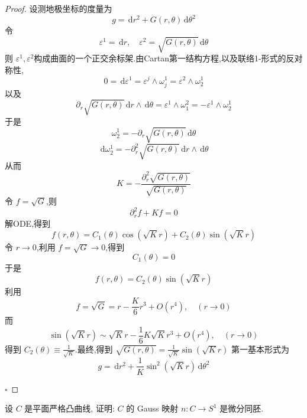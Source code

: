 \documentclass[../../main.tex]{subfiles}
\begin{document}
\begin{proof}
    设测地极坐标的度量为 \[
    g = \,\mathrm{d} r^{2}+ G\left( r, \theta  \right)\,\mathrm{d}  \theta ^{2} 
    \]令 \[
     \varepsilon ^{1}= \,\mathrm{d} r,\quad  \varepsilon ^{2}= \sqrt{G\left( r, \theta  \right) }\,\mathrm{d}  \theta 
    \]则 \(   \varepsilon ^{1}, \varepsilon ^{2}  \)构成曲面的一个正交余标架.由Cartan第一结构方程,以及联络1-形式的反对称性, \[
0= \,\mathrm{d}  \varepsilon ^{1}= \varepsilon ^{j} \wedge \omega _{j}^{1}=  \varepsilon ^{2}\wedge  \omega _{2}^{1}
    \] 以及 \[
     \partial _{r}\sqrt{G\left( r, \theta  \right) }\,\mathrm{d} r\wedge \,\mathrm{d}  \theta =  \varepsilon ^{1}\wedge  \omega _{1}^{2}= - \varepsilon ^{1}\wedge  \omega _{2}^{1}
    \]于是 \[
     \omega _{2}^{1}=- \partial _{r}\sqrt{G\left( r, \theta  \right) }\,\mathrm{d}  \theta 
    \]  \[
    \,\mathrm{d}  \omega _{2}^{1}= - \partial _{r}^{2}\sqrt{G\left( r, \theta  \right) }\,\mathrm{d} r\wedge \,\mathrm{d}  \theta 
    \]从而\[
    K= -\frac{ \partial _{r}^{2}\sqrt{G\left( r, \theta  \right) } }{\sqrt{G\left( r, \theta  \right) } } 
    \]令 \(  f= \sqrt{G}  \),则 \[
     \partial _{r}^{2}f+ Kf= 0
    \] 解ODE,得到  \[
    f\left( r, \theta  \right)= C_1\left(  \theta  \right)  \cos \left( \sqrt{K} r \right)+ C_2\left(  \theta  \right)\sin   \left( \sqrt{K}r \right)   
    \]令 \(  r\to 0  \),利用 \(  f= \sqrt{G}\to 0  \),得到 \[
    C_1\left(  \theta  \right)= 0 
    \]  于是 \[
    f\left( r, \theta  \right)= C_2\left(  \theta  \right)\sin \left( \sqrt{K}r \right)   
    \]利用 \[
    f= \sqrt{G}= r-\frac{K }{6 }r^{3}+ O\left( r^{4} \right)  ,\quad \left( r\to 0 \right) 
    \]而 \[
    \sin \left( \sqrt{K}r \right)\sim \sqrt{K}r-\frac{1 }{6 } K\sqrt{K}r^{3}+ O\left( r^{4} \right)   ,\quad \left( r\to 0 \right) 
    \]得到 \(  C_2\left(  \theta  \right)\equiv \frac{1 }{\sqrt{K} }    \).最终,得到 \(  \sqrt{G\left( r, \theta  \right) }= \frac{1}{\sqrt{K}}\sin \left( \sqrt{K}r \right)   \)  第一基本形式为 \[
    g = \,\mathrm{d} r^{2}+  \frac{1 }{K } \sin ^{2}\left( \sqrt{K}r \right)  \,\mathrm{d}  \theta ^{2}
    \]

    \hfill $\square$
\end{proof}
\begin{problem}
 设 $C$ 是平面严格凸曲线, 证明: $C$ 的 Gauss 映射 $n: C \to S^1$ 是微分同胚.
\end{problem}
\end{document}
